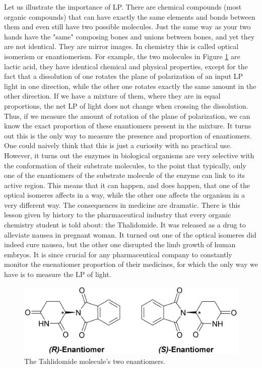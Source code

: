 \documentclass[11pt, a4paper, twoside]{article} %
\begin{document}
Let us illustrate the importance of LP. There are chemical compounds (most organic compounds) that can have exactly the same elements and bonds between them and even still have two possible molecules. Just the same way as your two hands have the "same" composing bones and unions between bones, and yet they are not identical. They are mirror images. In chemistry this is called optical isomerism or enantiomerism. For example, the two molecules in Figure \ref{fig:thalidomide} are lactic acid, they have identical chemical and physical properties, except for the fact that a dissolution of one rotates the plane of polarization of an input LP light in one direction, while the other one rotates exactly the same amount in the other direction. If we have a mixture of them, where they are in equal proportions, the net LP of light does not change when crossing the dissolution. Thus, if we measure the amount of rotation of the plane of polarization, we can know the exact proportion of these enantiomers present in the mixture. It turns out this is the only way to measure the presence and proportion of enantiomers. One could naively think that this is just a curiosity with no practical use. However, it turns out the enzymes in biological organisms are very selective with the conformation of their substrate molecules, to the point that typically, only one of the enantiomers of the substrate molecule of the enzyme can link to its active region. This means that it can happen, and does happen, that one of the optical isomeres affects in a way, while the other one affects the organism in a very different way. The consequences in medicine are dramatic. There is this lesson given by history to the pharmaceutical industry that every organic chemistry student is told about: the Thalidomide. It was released as a drug to alleviate nausea in pregnant woman. It turned out one of the optical isomeres did indeed cure nausea, but the other one disrupted the limb growth of human embryos. It is since crucial for any pharmaceutical company to constantly monitor the enenatiomer proportion of their medicines, for which the only way we have is to measure the LP of light.

\begin{figure}[h!] 
     \centering 
    \includegraphics[width=0.5\linewidth]{thalidomide.png}
    \caption{The Tahlidomide molecule's two enantiomers.}
    \label{fig:thalidomide}
\end{figure}
\end{document}
